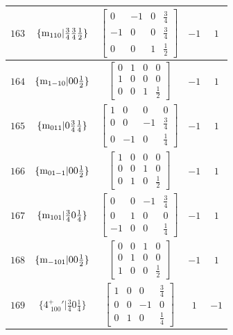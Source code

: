 \documentclass[fleqn,8pt]{jsarticle}
\begin{document}
\begin{longtable}{ccccc}
$ 163 $ & $ \{{\rm m}_{110}|\frac{3}{4} \frac{3}{4} \frac{1}{2}\} $ & $ \begin{bmatrix} 0 & -1 & 0 & \frac{3}{4} \\ -1 & 0 & 0 & \frac{3}{4} \\ 0 & 0 & 1 & \frac{1}{2} \end{bmatrix} $ & $ -1 $ & $ 1 $ \\ \hline
$ 164 $ & $ \{{\rm m}_{1-10}|0 0 \frac{1}{2}\} $ & $ \begin{bmatrix} 0 & 1 & 0 & 0 \\ 1 & 0 & 0 & 0 \\ 0 & 0 & 1 & \frac{1}{2} \end{bmatrix} $ & $ -1 $ & $ 1 $ \\ \hline
$ 165 $ & $ \{{\rm m}_{011}|0 \frac{3}{4} \frac{1}{4}\} $ & $ \begin{bmatrix} 1 & 0 & 0 & 0 \\ 0 & 0 & -1 & \frac{3}{4} \\ 0 & -1 & 0 & \frac{1}{4} \end{bmatrix} $ & $ -1 $ & $ 1 $ \\ \hline
$ 166 $ & $ \{{\rm m}_{01-1}|0 0 \frac{1}{2}\} $ & $ \begin{bmatrix} 1 & 0 & 0 & 0 \\ 0 & 0 & 1 & 0 \\ 0 & 1 & 0 & \frac{1}{2} \end{bmatrix} $ & $ -1 $ & $ 1 $ \\ \hline
$ 167 $ & $ \{{\rm m}_{101}|\frac{3}{4} 0 \frac{1}{4}\} $ & $ \begin{bmatrix} 0 & 0 & -1 & \frac{3}{4} \\ 0 & 1 & 0 & 0 \\ -1 & 0 & 0 & \frac{1}{4} \end{bmatrix} $ & $ -1 $ & $ 1 $ \\ \hline
$ 168 $ & $ \{{\rm m}_{-101}|0 0 \frac{1}{2}\} $ & $ \begin{bmatrix} 0 & 0 & 1 & 0 \\ 0 & 1 & 0 & 0 \\ 1 & 0 & 0 & \frac{1}{2} \end{bmatrix} $ & $ -1 $ & $ 1 $ \\ \hline
$ 169 $ & $ \{4^{+}_{\,\,100}{}'|\frac{3}{4} 0 \frac{1}{4}\} $ & $ \begin{bmatrix} 1 & 0 & 0 & \frac{3}{4} \\ 0 & 0 & -1 & 0 \\ 0 & 1 & 0 & \frac{1}{4} \end{bmatrix} $ & $ 1 $ & $ -1 $ \\ \hline

\end{longtable}
\end{document}
